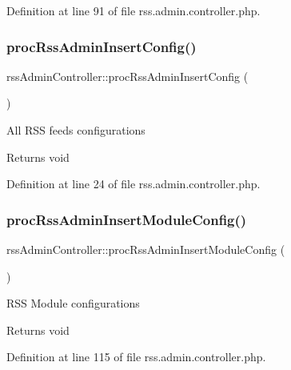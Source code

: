 Definition at line 91 of file rss.\+admin.\+controller.\+php.

\mbox{\label{classrssAdminController_abacdc1717d07ac5cfe2d4bb83f08d310}} 
\subsubsection{\texorpdfstring{proc\+Rss\+Admin\+Insert\+Config()}{procRssAdminInsertConfig()}}
{\footnotesize\ttfamily rss\+Admin\+Controller\+::proc\+Rss\+Admin\+Insert\+Config (\begin{DoxyParamCaption}{ }\end{DoxyParamCaption})}

All R\+SS feeds configurations

\begin{DoxyReturn}{Returns}
void 
\end{DoxyReturn}


Definition at line 24 of file rss.\+admin.\+controller.\+php.

\mbox{\label{classrssAdminController_ae07c8748cdccb2d13dfb4140e9c13aeb}} 
\subsubsection{\texorpdfstring{proc\+Rss\+Admin\+Insert\+Module\+Config()}{procRssAdminInsertModuleConfig()}}
{\footnotesize\ttfamily rss\+Admin\+Controller\+::proc\+Rss\+Admin\+Insert\+Module\+Config (\begin{DoxyParamCaption}{ }\end{DoxyParamCaption})}

R\+SS Module configurations

\begin{DoxyReturn}{Returns}
void 
\end{DoxyReturn}


Definition at line 115 of file rss.\+admin.\+controller.\+php.

